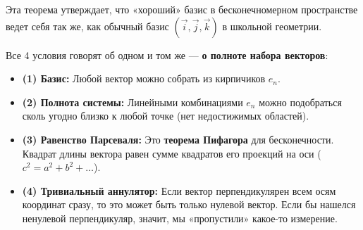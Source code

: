 \begin{idea}
	
	Эта теорема утверждает, что «хороший» базис в бесконечномерном пространстве ведет себя так же, как обычный базис $(\vec{i}, \vec{j}, \vec{k})$ в школьной геометрии.
	
	Все 4 условия говорят об одном и том же — \textbf{о полноте набора векторов}:
	
	\begin{itemize}
		
		\item \textbf{(1) Базис:} Любой вектор можно собрать из кирпичиков $e_n$.
		
		\item \textbf{(2) Полнота системы:} Линейными комбинациями $e_n$ можно подобраться сколь угодно близко к любой точке (нет недостижимых областей).
		
		\item \textbf{(3) Равенство Парсеваля:} Это \textbf{теорема Пифагора} для бесконечности. Квадрат длины вектора равен сумме квадратов его проекций на оси ($c^2 = a^2 + b^2 + \dots$).
		
		\item \textbf{(4) Тривиальный аннулятор:} Если вектор перпендикулярен всем осям координат сразу, то это может быть только нулевой вектор. Если бы нашелся ненулевой перпендикуляр, значит, мы «пропустили» какое-то измерение.
		
	\end{itemize}
	
\end{idea}
	
